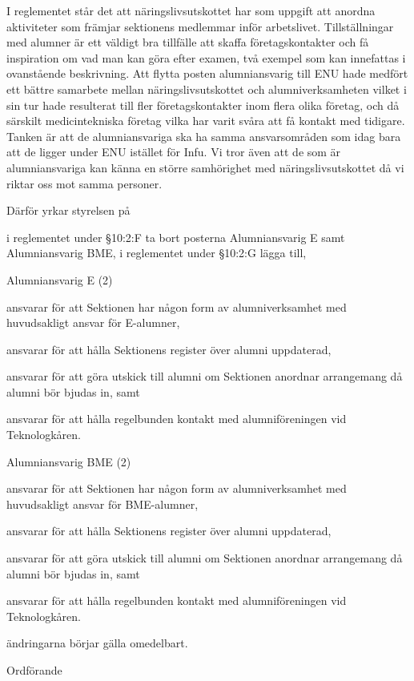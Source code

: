 \documentclass[../_main/handlingar.tex]{subfiles}
\begin{document}
I reglementet står det att näringslivsutskottet har som uppgift att anordna aktiviteter som främjar sektionens medlemmar inför arbetslivet. Tillställningar med alumner är ett väldigt bra tillfälle att skaffa företagskontakter och få inspiration om vad man kan göra efter examen, två exempel som kan innefattas i ovanstående beskrivning. Att flytta posten alumniansvarig till ENU hade medfört ett bättre samarbete mellan näringslivsutskottet och alumniverksamheten vilket i sin tur hade resulterat till fler företagskontakter inom flera olika företag, och då särskilt medicintekniska företag vilka har varit svåra att få kontakt med tidigare. Tanken är att de alumniansvariga ska ha samma ansvarsområden som idag bara att de ligger under ENU istället för Infu. Vi tror även att de som är alumniansvariga kan känna en större samhörighet med näringslivsutskottet då vi riktar oss mot samma personer.

Därför yrkar styrelsen på



\begin{attsatser}
    \att i reglementet under §10:2:F ta bort posterna Alumniansvarig E samt Alumniansvarig BME,
    \att i reglementet under §10:2:G lägga till,

    Alumniansvarig E (2)
        \begin{tightdashlist}
            \item ansvarar för att Sektionen har någon form av alumniverksamhet med huvudsakligt ansvar för E-alumner,
            \item ansvarar för att hålla Sektionens register över alumni uppdaterad,
            \item ansvarar för att göra utskick till alumni om Sektionen anordnar arrangemang då alumni bör bjudas in, samt
            \item ansvarar för att hålla regelbunden kontakt med alumniföreningen vid Teknologkåren.
        \end{tightdashlist}

        Alumniansvarig BME (2)
          \begin{tightdashlist}
              \item ansvarar för att Sektionen har någon form av alumniverksamhet med huvudsakligt ansvar för BME-alumner,
              \item ansvarar för att hålla Sektionens register över alumni uppdaterad,
              \item ansvarar för att göra utskick till alumni om Sektionen anordnar arrangemang då alumni bör bjudas in, samt
              \item ansvarar för att hålla regelbunden kontakt med alumniföreningen vid Teknologkåren.
          \end{tightdashlist}
          \att ändringarna börjar gälla omedelbart.
\end{attsatser}



\begin{signatures}{1}
    \ist
    \signature{\ordf}{Ordförande}
\end{signatures}
\end{document}

